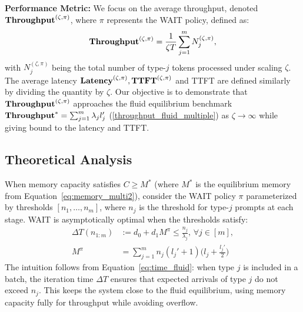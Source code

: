 


\textbf{Performance Metric:} We focus on the average throughput, denoted $\textbf{Throughput}^{(\zeta, \pi)}$, where $\pi$ represents the WAIT policy, defined as:
\[
\textbf{Throughput}^{(\zeta, \pi)} = \frac{1}{\zeta T} \sum_{j=1}^m N_j^{(\zeta, \pi)},
\]
with $N_j^{(\zeta, \pi)}$ being the total number of type-$j$ tokens processed under scaling $\zeta$. The average latency $\textbf{Latency}^{(\zeta,\pi)},\textbf{TTFT}^{(\zeta,\pi)}$ and TTFT are defined similarly by dividing the quantity by $\zeta$. Our objective is to demonstrate that $\textbf{Throughput}^{(\zeta, \pi)}$ approaches the fluid equilibrium benchmark $\textbf{Throughput}^* = \sum_{j=1}^m \lambda_j l_j'$ (\ref{throughput_fluid_multiple}) as $\zeta \to \infty$ while giving bound to the latency and TTFT.

\subsection{Theoretical Analysis}
\label{subsec:main_theorem}
When memory capacity satisfies \(C \geq M^*\) (where $M^*$ is the equilibrium memory from Equation~\eqref{eq:memory_multi2}), consider the WAIT policy \(\pi\) parameterized by thresholds \([n_1, \dots, n_m]\), where \(n_j\) is the threshold for type-$j$ prompts at each stage. WAIT is asymptotically optimal when the thresholds satisfy:
\begin{equation}
\label{eq:wait_thresholds}
\begin{aligned}
\Delta T(n_{1:m}) &:= d_0 + d_1 M^{\pi} \leq \tfrac{n_j}{\lambda_j},\, \forall j\in[m],\\
 M^{\pi} &= \sum_{j=1}^m n_j (l_j' + 1) \big(l_j + \tfrac{l_j'}{2}\big)
\end{aligned}
\end{equation}
The intuition follows from Equation~\eqref{eq:time_fluid}: when type $j$ is included in a batch, the iteration time $\Delta T$ ensures that expected arrivals of type $j$ do not exceed $n_j$. This keeps the system close to the fluid equilibrium, using memory capacity fully for throughput while avoiding overflow.

